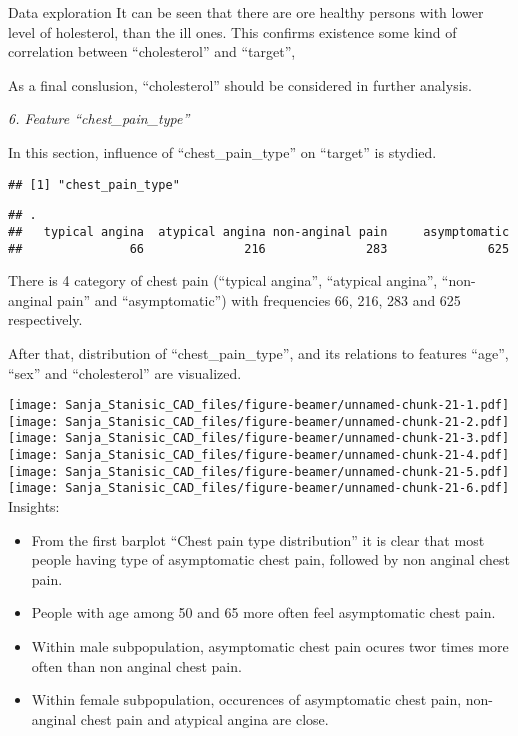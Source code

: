 \documentclass[
  ignorenonframetext,
]{beamer}
\begin{document}
\begin{frame}[fragile]{Data exploration}
It can be seen that there are ore healthy persons with lower level of
holesterol, than the ill ones. This confirms existence some kind of
correlation between ``cholesterol'' and ``target'',

As a final conslusion, ``cholesterol'' should be considered in further
analysis.

\emph{6. Feature ``chest\_pain\_type''}

In this section, influence of ``chest\_pain\_type'' on ``target'' is
stydied.

\begin{verbatim}
## [1] "chest_pain_type"
\end{verbatim}

\begin{verbatim}
## .
##   typical angina  atypical angina non-anginal pain     asymptomatic 
##               66              216              283              625
\end{verbatim}

There is 4 category of chest pain (``typical angina'', ``atypical
angina'', ``non-anginal pain'' and ``asymptomatic'') with frequencies
66, 216, 283 and 625 respectively.

After that, distribution of ``chest\_pain\_type'', and its relations to
features ``age'', ``sex'' and ``cholesterol'' are visualized.

\texttt{[image: Sanja\_Stanisic\_CAD\_files/figure-beamer/unnamed-chunk-21-1.pdf]}
\texttt{[image: Sanja\_Stanisic\_CAD\_files/figure-beamer/unnamed-chunk-21-2.pdf]}
\texttt{[image: Sanja\_Stanisic\_CAD\_files/figure-beamer/unnamed-chunk-21-3.pdf]}
\texttt{[image: Sanja\_Stanisic\_CAD\_files/figure-beamer/unnamed-chunk-21-4.pdf]}
\texttt{[image: Sanja\_Stanisic\_CAD\_files/figure-beamer/unnamed-chunk-21-5.pdf]}
\texttt{[image: Sanja\_Stanisic\_CAD\_files/figure-beamer/unnamed-chunk-21-6.pdf]}
Insights:

\begin{itemize}
\item
  From the first barplot ``Chest pain type distribution'' it is clear
  that most people having type of asymptomatic chest pain, followed by
  non anginal chest pain.
\item
  People with age among 50 and 65 more often feel asymptomatic chest
  pain.
\item
  Within male subpopulation, asymptomatic chest pain ocures twor times
  more often than non anginal chest pain.
\item
  Within female subpopulation, occurences of asymptomatic chest pain,
  non-anginal chest pain and atypical angina are close.
\end{itemize}


\end{frame}
\end{document}
